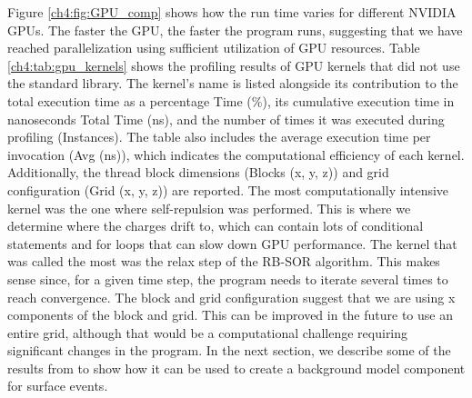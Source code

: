 Figure \ref{ch4:fig:GPU_comp} shows how the run time varies for different NVIDIA GPUs. The faster the GPU, the faster the program runs, suggesting that we have reached parallelization using sufficient utilization of GPU resources. Table \ref{ch4:tab:gpu_kernels} shows the profiling results of GPU kernels that did not use the standard library. The kernel's name is listed alongside its contribution to the total execution time as a percentage Time (\%), its cumulative execution time in nanoseconds Total Time (ns), and the number of times it was executed during profiling (Instances). The table also includes the average execution time per invocation (Avg (ns)), which indicates the computational efficiency of each kernel. Additionally, the thread block dimensions (Blocks (x, y, z)) and grid configuration (Grid (x, y, z)) are reported. The most computationally intensive kernel was the one where self-repulsion was performed. This is where we determine where the charges drift to, which can contain lots of conditional statements and for loops that can slow down GPU performance. The kernel that was called the most was the relax step of the RB-SOR algorithm. This makes sense since, for a given time step, the program needs to iterate several times to reach convergence. The block and grid configuration suggest that we are using x components of the block and grid. This can be improved in the future to use an entire grid, although that would be a computational challenge requiring significant changes in the program. In the next section, we describe some of the results from {\ehd} to show how it can be used to create a background model component for surface events.



